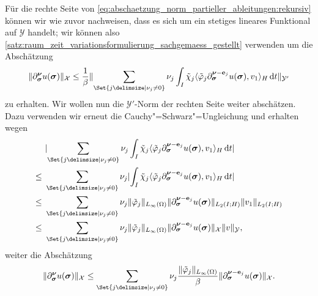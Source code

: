 \begin{Satz}
\begin{Beweis}
        Für die rechte Seite von \cref{eq:abschaetzung_norm_partieller_ableitungen:rekursiv} können wir wie zuvor nachweisen, dass es sich um ein stetiges lineares Funktional auf $\mathcal Y$ handelt; wir können also \cref{satz:raum_zeit_variationsformulierung_sachgemaess_gestellt} verwenden um die Abschätzung
        \begin{equation}
            \norm{\partial^{\bm\nu}_{\bm\sigma} u(\bm\sigma)}_{\mathcal X} \leq \frac{1}{\beta} \norm{\sum_{\Set{j \given \nu_{j} \neq 0}} \nu_{j} \int_{I} \tilde{\chi}_{j} \skp{\tilde{\varphi}_{j} \partial^{\bm\nu - \vec e_{j}}_{\bm\sigma} u(\bm\sigma)}{v_{1}}{H} \diff t}_{\mathcal Y'}
        \end{equation}
        zu erhalten.
        Wir wollen nun die $\mathcal Y'$-Norm der rechten Seite weiter abschätzen.
        Dazu verwenden wir erneut die Cauchy"=Schwarz"=Ungleichung und erhalten wegen
        \begin{align}
            &\abs{\sum_{\Set{j \given \nu_{j} \neq 0}} \nu_{j} \int_{I} \tilde{\chi}_{j} \skp{\tilde{\varphi}_{j} \partial^{\bm\nu - \vec e_{j}}_{\bm\sigma} u(\bm\sigma)}{v_{1}}{H} \diff t}
            \\\leq~
            &\sum_{\Set{j \given \nu_{j} \neq 0}} \nu_{j} \abs {\int_{I} \tilde{\chi}_{j} \skp{\tilde{\varphi}_{j} \partial^{\bm\nu - \vec e_{j}}_{\bm\sigma} u(\bm\sigma)}{v_{1}}{H} \diff t}
            \\\leq~
            &\sum_{\Set{j \given \nu_{j} \neq 0}} \nu_{j} \norm{\tilde{\varphi}_{j}}_{L_{\infty}(\Omega)} \norm{\partial^{\bm\nu - \vec e_{j}}_{\bm\sigma} u(\bm\sigma)}_{L_{2}(I; H)} \norm{v_{1}}_{L_{2}(I; H)}
            \\\leq~
            &\sum_{\Set{j \given \nu_{j} \neq 0}} \nu_{j} \norm{\tilde{\varphi}_{j}}_{L_{\infty}(\Omega)} \norm{\partial^{\bm\nu - \vec e_{j}}_{\bm\sigma} u(\bm\sigma)}_{\mathcal X} \norm{v}_{\mathcal Y},
        \end{align}
        weiter die Abschätzung
        \begin{equation}
            \label{eq:abschaetzung_norm_partieller_ableitungen:rekursive_schranke}
            \norm{\partial^{\bm\nu}_{\bm\sigma} u(\bm\sigma)}_{\mathcal X} \leq \sum_{\Set{j \given \nu_{j} \neq 0}} \nu_{j} \frac{\norm{\tilde{\varphi}_{j}}_{L_{\infty}(\Omega)}}{\beta} \norm{\partial^{\bm\nu - \vec e_{j}}_{\bm\sigma} u(\bm\sigma)}_{\mathcal X}.
        \end{equation}


\end{Beweis}
\end{Satz}
